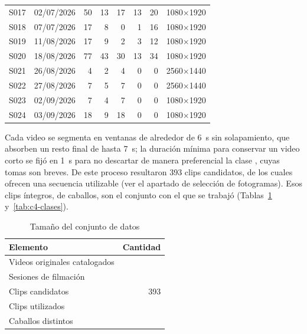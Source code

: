 \begin{table}[H]
{\begin{tabular}{@{}llrrrrrl@{}}
S017 & 02/07/2026 & 50 & 13 & 17 & 13 & 20 & 1080$\times$1920 \\
S018 & 07/07/2026 & 17 & 8 & 0 & 1 & 16 & 1080$\times$1920 \\
S019 & 11/08/2026 & 17 & 9 & 2 & 3 & 12 & 1080$\times$1920 \\
S020 & 18/08/2026 & 77 & 43 & 30 & 13 & 34 & 1080$\times$1920 \\
S021 & 26/08/2026 & 4 & 2 & 4 & 0 & 0 & 2560$\times$1440 \\
S022 & 27/08/2026 & 7 & 5 & 7 & 0 & 0 & 2560$\times$1440 \\
S023 & 02/09/2026 & 7 & 4 & 7 & 0 & 0 & 1080$\times$1920 \\
S024 & 03/09/2026 & 18 & 9 & 18 & 0 & 0 & 1080$\times$1920 \\
\bottomrule
\end{tabular}}
\end{table}

Cada video se segmenta en ventanas de alrededor de 6~s sin solapamiento, que absorben un resto final de hasta 7~s; la duración mínima para conservar un video corto se fijó en 1~s para no descartar de manera preferencial la clase , cuyas tomas son breves. De este proceso resultaron 393 clips candidatos, de los cuales \ClipsTotal{} ofrecen una secuencia utilizable (ver el apartado de selección de fotogramas). Esos \ClipsTotal{} clips íntegros, de \CaballosTotal{} caballos, son el conjunto con el que se trabajó (Tablas~\ref{tab:c4-tamano} y~\ref{tab:c4-clases}).

\begin{table}[H]
\caption{Tamaño del conjunto de datos}\label{tab:c4-tamano}
{\singlespacing
\begin{tabular}{@{}lr@{}}
\toprule
Elemento & Cantidad \\
\midrule
Videos originales catalogados & \VideosTotal{} \\
Sesiones de filmación & \SesionesTotal{} \\
Clips candidatos & 393 \\
Clips utilizados & \ClipsTotal{} \\
Caballos distintos & \CaballosTotal{} \\
\bottomrule
\end{tabular}}
\end{table}

